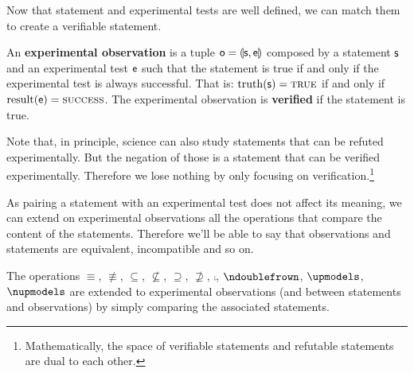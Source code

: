 \documentclass[11pt,letterpaper,fleqn]{memoir} %
\begin{document}
Now that statement and experimental tests are well defined, we can match them to create a verifiable statement.

\begin{mathSection}
\begin{defn}
	An \textbf{experimental observation} is a tuple $\mathsf{o} = \llparenthesis \mathsf{s}, \mathsf{e} \rrparenthesis$ composed by a statement $\mathsf{s}$ and an experimental test $\mathsf{e}$ such that the statement is true if and only if the  experimental test is always successful. That is: $\operatorname{truth}(\mathsf{s})=\textsc{true}$ if and only if $\operatorname{result}(\mathsf{e})=\textsc{success}$. The experimental observation is \textbf{verified} if the statement is true.
\end{defn}
\end{mathSection}

Note that, in principle, science can also study statements that can be refuted experimentally. But the negation of those is a statement that can be verified experimentally. Therefore we lose nothing by only focusing on verification.\footnote{Mathematically, the space of verifiable statements and refutable statements are dual to each other.}

As pairing a statement with an experimental test does not affect its meaning, we can extend on experimental observations all the operations that compare the content of the statements. Therefore we'll be able to say that observations and statements are equivalent, incompatible and so on.

\begin{mathSection}
\begin{defn}
	The operations $\equiv$, $\nequiv$, $\subseteq$, $\nsubseteq$, $\supseteq$, $\nsupseteq$, $\comp$, $\ncomp$, $\indep$, $\nindep$ are extended to experimental observations (and between statements and observations) by simply comparing the associated statements.
\end{defn}
\end{mathSection}
\end{document}
